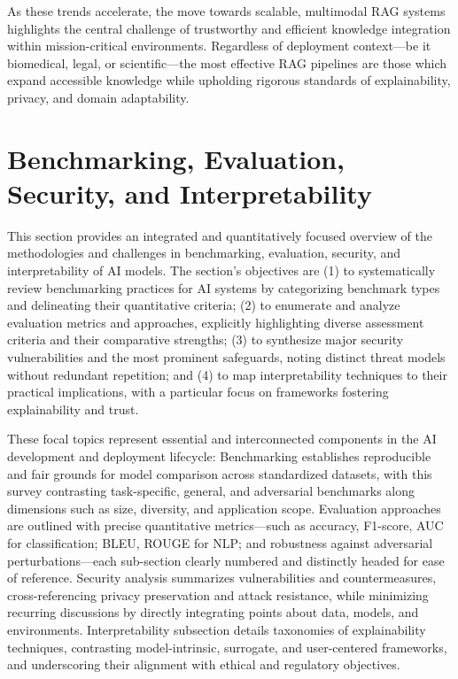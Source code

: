 \documentclass[sigconf]{acmart}
\begin{document}
As these trends accelerate, the move towards scalable, multimodal RAG systems highlights the central challenge of trustworthy and efficient knowledge integration within mission-critical environments. Regardless of deployment context—be it biomedical, legal, or scientific—the most effective RAG pipelines are those which expand accessible knowledge while upholding rigorous standards of explainability, privacy, and domain adaptability.

\section{Benchmarking, Evaluation, Security, and Interpretability}

This section provides an integrated and quantitatively focused overview of the methodologies and challenges in benchmarking, evaluation, security, and interpretability of AI models. The section's objectives are (1) to systematically review benchmarking practices for AI systems by categorizing benchmark types and delineating their quantitative criteria; (2) to enumerate and analyze evaluation metrics and approaches, explicitly highlighting diverse assessment criteria and their comparative strengths; (3) to synthesize major security vulnerabilities and the most prominent safeguards, noting distinct threat models without redundant repetition; and (4) to map interpretability techniques to their practical implications, with a particular focus on frameworks fostering explainability and trust.

These focal topics represent essential and interconnected components in the AI development and deployment lifecycle: Benchmarking establishes reproducible and fair grounds for model comparison across standardized datasets, with this survey contrasting task-specific, general, and adversarial benchmarks along dimensions such as size, diversity, and application scope. Evaluation approaches are outlined with precise quantitative metrics—such as accuracy, F1-score, AUC for classification; BLEU, ROUGE for NLP; and robustness against adversarial perturbations—each sub-section clearly numbered and distinctly headed for ease of reference. Security analysis summarizes vulnerabilities and countermeasures, cross-referencing privacy preservation and attack resistance, while minimizing recurring discussions by directly integrating points about data, models, and environments. Interpretability subsection details taxonomies of explainability techniques, contrasting model-intrinsic, surrogate, and user-centered frameworks, and underscoring their alignment with ethical and regulatory objectives.
\end{document}
